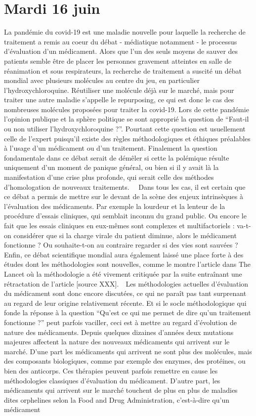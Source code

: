 \section*{Mardi 16 juin}

\begin{leftbubbles}
La pandémie du covid-19 est une maladie nouvelle pour laquelle la recherche de traitement a remis au coeur du débat - médiatique notamment - le processus d’évaluation d’un médicament. Alors que l’un des seuls moyens de sauver des patients semble être de placer les personnes gravement atteintes en salle de réanimation et sous respirateurs, la recherche de traitement a suscité un débat mondial avec plusieurs molécules au centre du jeu, en particulier l’hydroxychloroquine. Réutiliser une molécule déjà sur le marché, mais pour traiter une autre maladie s’appelle le repurposing, ce qui est donc le cas des nombreuses molécules proposées pour traiter la covid-19. Lors de cette pandémie l’opinion publique et la sphère politique se sont approprié la question de “Faut-il ou non utiliser l'hydroxychloroquine ?”. Pourtant cette question est usuellement celle de l’expert puisqu’il existe des règles méthodologiques et éthiques préalables à l’usage d’un médicament ou d’un traitement. Finalement la question fondamentale dans ce débat serait de démêler si cette la polémique résulte uniquement d’un moment de panique général, ou bien si il y avait là la manifestation d’une crise plus profonde, qui serait celle des méthodes d’homologation de nouveaux traitements. \ \ Dans tous les cas, il est certain que ce débat a permis de mettre sur le devant de la scène des enjeux intrinsèques à l’évaluation des médicaments. Par exemple la lourdeur et la lenteur de la procédure d’essais cliniques, qui semblait inconnu du grand public. Ou encore le fait que les essais cliniques en eux-mêmes sont complexes et multifactoriels : va-t-on considérer que si la charge virale du patient diminue, alors le médicament fonctionne ? Ou souhaite-t-on au contraire regarder si des vies sont sauvées ? Enfin, ce débat scientifique mondial aura également laissé une place forte à des études dont les méthodologies sont nouvelles, comme le montre l’article dans The Lancet où la méthodologie a été vivement critiquée par la suite entraînant une rétractation de l’article [source XXX].\ \ Les méthodologies actuelles d’évaluation du médicament sont donc encore discutées, ce qui ne paraît pas tant surprenant au regard de leur origine relativement récente. Et si le socle méthodologique qui fonde la réponse à la question “Qu’est ce qui me permet de dire qu’un traitement fonctionne ?” peut parfois vaciller, ceci est à mettre au regard d’évolution de nature des médicaments. Depuis quelques dizaines d’années deux mutations majeures affectent la nature des nouveaux médicaments qui arrivent sur le marché. D’une part les médicaments qui arrivent ne sont plus des molécules, mais des composants biologiques, comme par exemple des enzymes, des protéines, ou bien des anticorps. Ces thérapies peuvent parfois remettre en cause les méthodologies classiques d’évaluation du médicament. D’autre part, les médicaments qui arrivent sur le marché touchent de plus en plus de maladies dites orphelines selon la Food and Drug Administration, c’est-à-dire qu’un médicament 
\end{leftbubbles}
